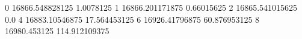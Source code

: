 0 16866.548828125 1.0078125
1 16866.201171875 0.66015625
2 16865.541015625 0.0
4 16883.10546875 17.564453125
6 16926.41796875 60.876953125
8 16980.453125 114.912109375
